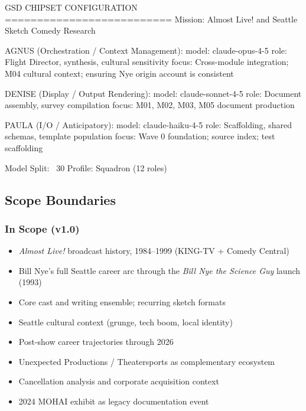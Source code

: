 \documentclass[11pt,letterpaper]{article}
\begin{document}
\begin{asciibox}
GSD CHIPSET CONFIGURATION
==========================
Mission: Almost Live! and Seattle Sketch Comedy Research

AGNUS (Orchestration / Context Management):
  model: claude-opus-4-5
  role: Flight Director, synthesis, cultural sensitivity
  focus: Cross-module integration; M04 cultural context;
         ensuring Nye origin account is consistent

DENISE (Display / Output Rendering):
  model: claude-sonnet-4-5
  role: Document assembly, survey compilation
  focus: M01, M02, M03, M05 document production

PAULA (I/O / Anticipatory):
  model: claude-haiku-4-5
  role: Scaffolding, shared schemas, template population
  focus: Wave 0 foundation; source index; test scaffolding

Model Split: ~30%
Profile: Squadron (12 roles)
\end{asciibox}

\subsection{Scope Boundaries}

\subsubsection{In Scope (v1.0)}
\begin{itemize}[noitemsep]
  \item \textit{Almost Live!} broadcast history, 1984--1999 (KING-TV + Comedy Central)
  \item Bill Nye's full Seattle career arc through the \textit{Bill Nye the Science Guy} launch (1993)
  \item Core cast and writing ensemble; recurring sketch formats
  \item Seattle cultural context (grunge, tech boom, local identity)
  \item Post-show career trajectories through 2026
  \item Unexpected Productions / Theatersports as complementary ecosystem
  \item Cancellation analysis and corporate acquisition context
  \item 2024 MOHAI exhibit as legacy documentation event
\end{itemize}
\end{document}
